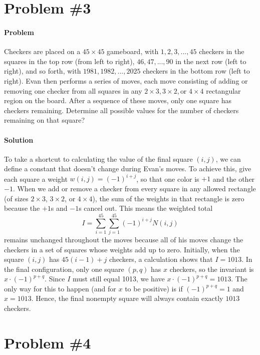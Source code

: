 \documentclass[10pt]{article}
\theoremstyle{plain}
\theoremstyle{definition}
\theoremstyle{remark}
\begin{document}
\section{Problem \#3}

\paragraph{Problem} Checkers are placed on a \(45\times45\) gameboard, with \(1,2,3,...,45\) checkers in the squares in the top row (from left to right), \(46,47,...,90\) in the next row (left to right), and so forth, with \(1981,1982,...,2025\) checkers in the bottom row (left to right). Evan then performs a series of moves, each move consisting of adding or removing one checker from all squares in any \(2\times3,3\times2,\text{or }4\times4\) rectangular region on the board. After a sequence of these moves, only one square has checkers remaining. Determine all possible values for the number of checkers remaining on that square?

\paragraph{Solution} To take a shortcut to calculating the value of the final square \((i,j)\), we can define a constant that doesn't change during Evan's moves. To achieve this, give each square a weight \(w(i,j)=(-1)^{i+j}\), so that one color is \(+1\) and the other \(-1\). When we add or remove a checker from every square in any allowed rectangle (of sizes \(2\times3\), \(3\times2\), or \(4\times4\)), the sum of the weights in that rectangle is zero because the \(+1\)s and \(-1\)s cancel out. This means the weighted total 
\[
I=\sum_{i=1}^{45}\sum_{j=1}^{45}(-1)^{i+j}N(i,j)
\]
remains unchanged throughout the moves because all of his moves change the checkers in a set of squares whose weights add up to zero. Initially, when the square \((i,j)\) has \(45(i-1)+j\) checkers, a calculation shows that \(I=1013\). In the final configuration, only one square \((p,q)\) has \(x\) checkers, so the invariant is \(x \cdot(-1)^{p+q}\). Since \(I\) must still equal 1013, we have \(x\cdot(-1)^{p+q}=1013\). The only way for this to happen (and for \(x\) to be positive) is if \((-1)^{p+q}=1\) and \(x=1013\). Hence, the final nonempty square will always contain exactly \(\boxed{1013}\) checkers.

\section{Problem \#4}
\end{document}
